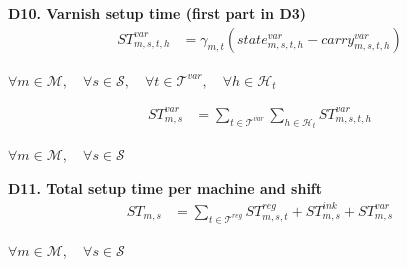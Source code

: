 \documentclass{article}
\begin{document}
\noindent\textbf{D10. Varnish setup time (first part in D3)}
\begin{align}
ST^{var}_{m,s,t,h}
&=
\gamma_{m,t}
\left(
state^{var}_{m,s,t,h}
-
carry^{var}_{m,s,t,h}
\right)
\label{eq:D10_var_time}
\end{align}
\begin{center}
$\forall m \in \mathcal{M}, \quad
\forall s \in \mathcal{S}, \quad
\forall t \in \mathcal{T}^{var}, \quad
\forall h \in \mathcal{H}_t$
\end{center}


\begin{align}
ST^{var}_{m,s}
&=
\sum_{t \in \mathcal{T}^{var}}
\sum_{h \in \mathcal{H}_t}
ST^{var}_{m,s,t,h}
\label{eq:D10_var_total}
\end{align}
\begin{center}
$\forall m \in \mathcal{M}, \quad \forall s \in \mathcal{S}$
\end{center}

\noindent\textbf{D11. Total setup time per machine and shift}
\begin{align}
ST_{m,s}
&=
\sum_{t \in \mathcal{T}^{reg}}
ST^{reg}_{m,s,t}
+
ST^{ink}_{m,s}
+
ST^{var}_{m,s}
\label{eq:D11_total_setup}
\end{align}
\begin{center}
$\forall m \in \mathcal{M}, \quad
\forall s \in \mathcal{S}$
\end{center}
\end{document}
